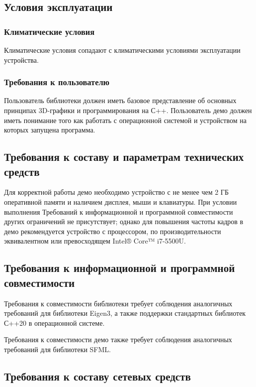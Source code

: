 \documentclass{../TechDoc}
\begin{document}
    \subsection{Условия эксплуатации}
    
    \subsubsection{Климатические условия}
    
    Климатические условия сопадают с климатическими условиями эксплуатации устройства.

    \subsubsection{Требования к пользователю}
    
    Пользователь библиотеки должен иметь базовое представление об основных принципах 3D-графики и программирования на С++.
    Пользователь демо должен иметь понимание того как работать с операционной системой и устройством на которых запущена программа.

    \subsection{Требования к составу и параметрам технических средств}
    
    Для корректной работы демо необходимо устройство с не менее чем 2 ГБ оперативной памяти и наличием дисплея, мыши и клавиатуры.
    При условии выполнения Требований к информационной и программной совместимости других ограничений не присутствует; однако для повышения частоты кадров в демо рекомендуется устройство с процессором, по производительности эквивалентном или превосходящем Intel® Core™ i7-5500U.
    
    \subsection{Требования к информационной и программной совместимости}
    
    Требования к совместимости библиотеки требует соблюдения аналогичных требований для библиотеки Eigen3, а также поддержки стандартных библиотек С++20 в операционной системе.
    
    Требования к совместимости демо также требует соблюдения аналогичных требований для библиотеки SFML.
    
    \subsection{Требования к составу сетевых средств}
    
\end{document}
